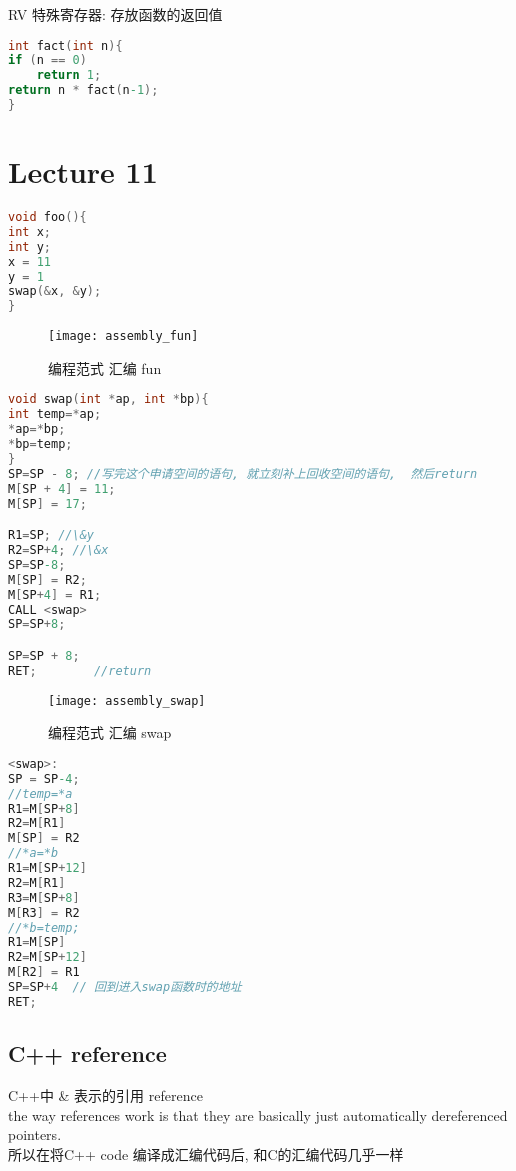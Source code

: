 \documentclass{article}
\begin{document}
RV 特殊寄存器: 存放函数的返回值

\begin{lstlisting}[language = C]
int fact(int n){
if (n == 0)
	return 1;
return n * fact(n-1);
}
\end{lstlisting}

\section{Lecture 11}
\begin{lstlisting}[language = C]
void foo(){
int x;
int y;
x = 11
y = 1
swap(&x, &y);
}
\end{lstlisting}
\begin{figure}[htbp]
	\centering
	\texttt{[image: assembly\_fun]}\\
	\caption{编程范式 汇编 fun}\label{fig.assembly.fun}
\end{figure}


\begin{lstlisting}[language = C]
void swap(int *ap, int *bp){
int temp=*ap;
*ap=*bp;
*bp=temp;
}
SP=SP - 8; //写完这个申请空间的语句, 就立刻补上回收空间的语句,  然后return
M[SP + 4] = 11;
M[SP] = 17;

R1=SP; //\&y
R2=SP+4; //\&x
SP=SP-8;
M[SP] = R2;
M[SP+4] = R1;
CALL <swap>
SP=SP+8;

SP=SP + 8;
RET;		//return
\end{lstlisting}

\begin{figure}[htbp]
	\centering
	\texttt{[image: assembly\_swap]}\\
	\caption{编程范式 汇编 swap}\label{fig.assembly.swap}
\end{figure}

\begin{lstlisting}[language = C]
<swap>:
SP = SP-4;
//temp=*a
R1=M[SP+8]
R2=M[R1]
M[SP] = R2
//*a=*b
R1=M[SP+12]
R2=M[R1]
R3=M[SP+8]
M[R3] = R2
//*b=temp;
R1=M[SP]
R2=M[SP+12]
M[R2] = R1
SP=SP+4  // 回到进入swap函数时的地址
RET;
\end{lstlisting}

\subsection{C++ reference}
C++中 \& 表示的引用 reference\\
the way references work is that they are basically just automatically dereferenced pointers.\\
所以在将C++ code 编译成汇编代码后, 和C的汇编代码几乎一样\\
\end{document}
